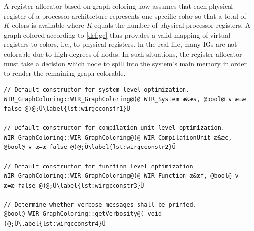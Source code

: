 A register allocator based on graph coloring now assumes that each physical register of a processor architecture represents one specific color so that a total of $K$ colors is available where $K$ equals the number of physical processor registers.
A graph colored according to \cref{def:gc} thus provides a valid mapping of virtual registers to colors, i.e., to physical registers.
In the real life, many \glspl{IG} are not colorable due to high degrees of nodes.
In such situations, the register allocator must take a decision which node to spill into the system's main memory in order to render the remaining graph colorable.

\begin{lstlisting}[style=code,float=t,caption={Constructors of Class \texttt{WIR\_GraphColoring}},label=lst:wirgcconstr]
// Default constructor for system-level optimization.
WIR_GraphColoring::WIR_GraphColoring@(@ WIR_System æ&æs, @bool@ v æ=æ false @)@;Ü\label{lst:wirgcconstr1}Ü

// Default constructor for compilation unit-level optimization.
WIR_GraphColoring::WIR_GraphColoring@(@ WIR_CompilationUnit æ&æc, @bool@ v æ=æ false @)@;Ü\label{lst:wirgcconstr2}Ü

// Default constructor for function-level optimization.
WIR_GraphColoring::WIR_GraphColoring@(@ WIR_Function æ&æf, @bool@ v æ=æ false @)@;Ü\label{lst:wirgcconstr3}Ü

// Determine whether verbose messages shall be printed.
@bool@ WIR_GraphColoring::getVerbosity@( void )@;Ü\label{lst:wirgcconstr4}Ü
\end{lstlisting}

